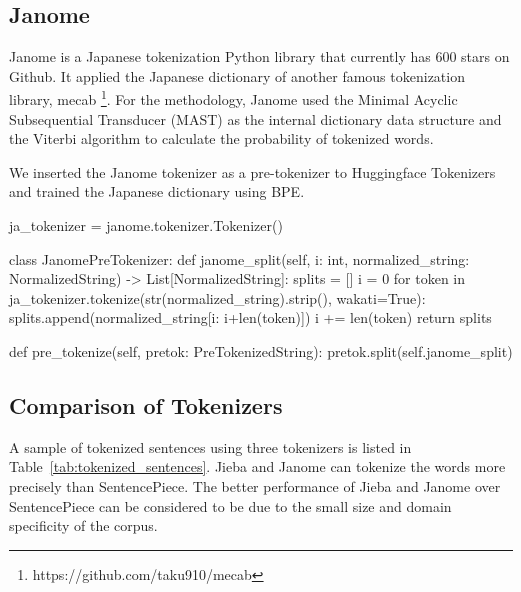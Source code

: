 \newpage

\subsection{Janome} \label{sec:janome}

Janome is a Japanese tokenization Python library that currently has 600 stars on Github. It applied the Japanese dictionary of another famous tokenization library, mecab \footnote{https://github.com/taku910/mecab}. For the methodology, Janome used the Minimal Acyclic Subsequential Transducer (MAST) as the internal dictionary data structure and the Viterbi algorithm to calculate the probability of tokenized words.

We inserted the Janome tokenizer as a pre-tokenizer to Huggingface Tokenizers and trained the Japanese dictionary using BPE.

\vspace{0.3cm}

\begin{python}
ja_tokenizer = janome.tokenizer.Tokenizer()

class JanomePreTokenizer:
    def janome_split(self, i: int, normalized_string: NormalizedString) -> List[NormalizedString]:
        splits = []
        i = 0
        for token in ja_tokenizer.tokenize(str(normalized_string).strip(), wakati=True):
            splits.append(normalized_string[i: i+len(token)])
            i += len(token)
        return splits
    
    def pre_tokenize(self, pretok: PreTokenizedString):
        pretok.split(self.janome_split)

\end{python}

\subsection{Comparison of Tokenizers} \label{sec:compare_tokenizers}

A sample of tokenized sentences using three tokenizers is listed in Table~\ref{tab:tokenized_sentences}. Jieba and Janome can tokenize the words more precisely than SentencePiece. The better performance of Jieba and Janome over SentencePiece can be considered to be due to the small size and domain specificity of the corpus.


